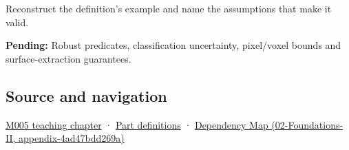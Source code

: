 Reconstruct the definition's example and name the assumptions that make it valid.

\textbf{Pending:} Robust predicates, classification uncertainty, pixel/voxel bounds and surface-extraction guarantees.

\subsection{Source and navigation}\label{appendix-c80db39080be-source-and-navigation}

\hyperref[01-foundations-i-ch001-when-arithmetic-meets-uncertainty]{M005 teaching chapter} · \hyperref[appendix-fd090d982a15-m005---parts-77-88]{Part definitions} · \href{../02-Foundations-II/main.pdf\#nameddest=appendix-4ad47bdd269a}{Dependency Map (02-Foundations-II, appendix-4ad47bdd269a)}
